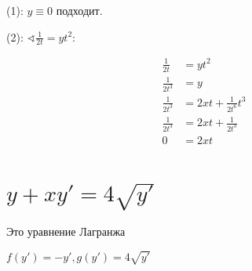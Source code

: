 (1): $y\equiv0$ подходит.

(2): $\sphericalangle \frac{1}{2t} = yt^2$:

\begin{align*}
    \frac{1}{2t}   & = yt^2                    \\
    \frac{1}{2t^3} & = y                       \\
    \frac{1}{2t^3} & = 2xt + \frac{1}{2t^6}t^3 \\
    \frac{1}{2t^3} & = 2xt + \frac{1}{2t^3}    \\
    0              & = 2xt                     \\
\end{align*}

\section{$y+xy'=4\sqrt{y'}$}

Это уравнение Лагранжа

$f(y') = -y', g(y') = 4\sqrt{y'}$

